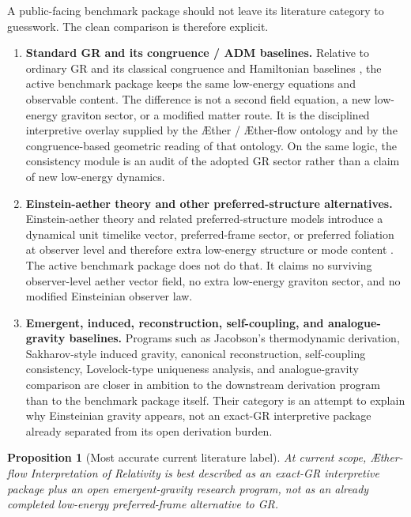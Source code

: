 \documentclass[11pt]{article}
\newcommand{\Aether}{\AE{}ther}
\newcommand{\Aflow}{\AE{}ther-flow}
\newcommand{\TheoryName}{\Aflow{} Interpretation of Relativity}
\newtheorem{proposition}{Proposition}
\begin{document}
A public-facing benchmark package should not leave its literature category to guesswork. The clean comparison is therefore explicit.
\begin{enumerate}
    \item \textbf{Standard GR and its congruence / ADM baselines.} Relative to ordinary GR and its classical congruence and Hamiltonian baselines \cite{Einstein1916,Raychaudhuri1955,EllisVanElst1999,ADM1962}, the active benchmark package keeps the same low-energy equations and observable content. The difference is not a second field equation, a new low-energy graviton sector, or a modified matter route. It is the disciplined interpretive overlay supplied by the \Aether{} / \Aflow{} ontology and by the congruence-based geometric reading of that ontology. On the same logic, the consistency module is an audit of the adopted GR sector rather than a claim of new low-energy dynamics.
    \item \textbf{Einstein-aether theory and other preferred-structure alternatives.} Einstein-aether theory and related preferred-structure models introduce a dynamical unit timelike vector, preferred-frame sector, or preferred foliation at observer level and therefore extra low-energy structure or mode content \cite{JacobsonMattingly2001,JacobsonMattingly2004,ElingJacobson2004,Jacobson2010,Jacobson2014,JacobsonSperanza2015,Horava2009}. The active benchmark package does not do that. It claims no surviving observer-level aether vector field, no extra low-energy graviton sector, and no modified Einsteinian observer law.
    \item \textbf{Emergent, induced, reconstruction, self-coupling, and analogue-gravity baselines.} Programs such as Jacobson's thermodynamic derivation, Sakharov-style induced gravity, canonical reconstruction, self-coupling consistency, Lovelock-type uniqueness analysis, and analogue-gravity comparison \cite{Jacobson1995,Visser2002,HojmanKucharTeitelboim1976,Deser2004,Lovelock1971,BarceloLiberatiVisser2011,Sakharov1967} are closer in ambition to the downstream derivation program than to the benchmark package itself. Their category is an attempt to explain why Einsteinian gravity appears, not an exact-GR interpretive package already separated from its open derivation burden.
\end{enumerate}

\begin{proposition}[Most accurate current literature label]
At current scope, \TheoryName{} is best described as an exact-GR interpretive package plus an open emergent-gravity research program, not as an already completed low-energy preferred-frame alternative to GR.
\end{proposition}
\end{document}
